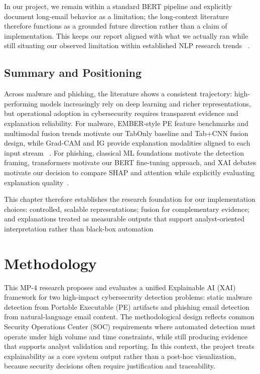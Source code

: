 \documentclass[conference]{IEEEtran}
\begin{document}
In our project, we remain within a standard BERT pipeline and explicitly document long-email behavior as a limitation; the long-context literature therefore functions as a grounded future direction rather than a claim of implementation. This keeps our report aligned with what we actually ran while still situating our observed limitation within established NLP research trends~\cite{JMKK2019} \cite{ZGDAA2020}.

\subsection{Summary and Positioning}

Across malware and phishing, the literature shows a consistent trajectory: high-performing models increasingly rely on deep learning and richer representations, but operational adoption in cybersecurity requires transparent evidence and explanation reliability. For malware, EMBER-style PE feature benchmarks and multimodal fusion trends motivate our TabOnly baseline and Tab+CNN fusion design, while Grad-CAM and IG provide explanation modalities aligned to each input stream~\cite{JMGPR2024}\cite{SZS25}\cite{SCDVPB2017}\cite{MAQ2017}\cite{HP20182018}\cite{NKJMB2011} . For phishing, classical ML foundations motivate the detection framing, transformers motivate our BERT fine-tuning approach, and XAI debates motivate our decision to compare SHAP and attention while explicitly evaluating explanation quality~\cite{LL2017}\cite{JMKK2019}\cite{JW2019}\cite{phishingDT}\cite{INA2007}\cite{SY2019}\cite{DJRLXSWB2020}.

This chapter therefore establishes the research foundation for our implementation choices: controlled, scalable representations; fusion for complementary evidence; and explanations treated as measurable outputs that support analyst-oriented interpretation rather than black-box automation~\cite{JMGPR2024}\cite{SZS25}\cite{SCDVPB2017}\cite{MAQ2017}\cite{LL2017}\cite{JW2019}\cite{JJMIMB2018}

\section{Methodology}

This MP-4 research proposes and evaluates a unified Explainable AI (XAI) framework for two high-impact cybersecurity detection problems: static malware detection from Portable Executable (PE) artifacts and phishing email detection from natural-language email content. The methodological design reflects common Security Operations Center (SOC) requirements where automated detection must operate under high volume and time constraints, while still producing evidence that supports analyst validation and reporting. In this context, the project treats explainability as a core system output rather than a post-hoc visualization, because security decisions often require justification and traceability.
\end{document}
